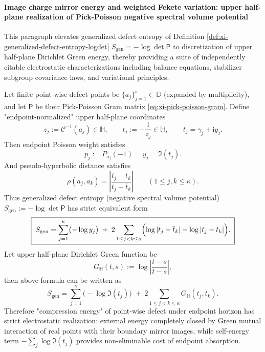 \paragraph{Image charge mirror energy and weighted Fekete variation: upper half-plane realization of Pick-Poisson negative spectral volume potential}
This paragraph elevates generalized defect entropy of Definition \ref{def:xi-generalized-defect-entropy-logdet}
\(
S_{\mathrm{gen}}=-\log\det\mathsf P
\)
to discretization of upper half-plane Dirichlet Green energy, thereby providing a suite of independently citable electrostatic characterizations including balance equations, stabilizer subgroup covariance laws, and variational principles.

\begin{proposition}\label{prop:xi-pick-poisson-image-charge-green-energy}
Let finite point-wise defect points be \(\{a_j\}_{j=1}^{\kappa}\subset\mathbb{D}\) (expanded by multiplicity), and let \(\mathsf P\) be their Pick-Poisson Gram matrix \eqref{eq:xi-pick-poisson-gram}.
Define "endpoint-normalized" upper half-plane coordinates
\[
z_j:=\mathcal{C}^{-1}(a_j)\in\mathbb{H},
\qquad
t_j:=-\frac{1}{z_j}\in\mathbb{H},
\qquad
t_j=\gamma_j+\mathrm{i}y_j.
\]
Then endpoint Poisson weight satisfies
\[
\boxed{\;p_j:=P_{a_j}(-1)=y_j=\Im(t_j).\;}
\]
And pseudo-hyperbolic distance satisfies
\[
\boxed{\;
\rho(a_j,a_k)=\left|\frac{t_j-t_k}{t_j-\overline t_k}\right|\qquad(1\le j,k\le\kappa).\;}
\]
Thus generalized defect entropy (negative spectral volume potential)
\(
S_{\mathrm{gen}}:=-\log\det\mathsf P
\)
has strict equivalent form
\[
\boxed{\;
S_{\mathrm{gen}}
=\sum_{j=1}^{\kappa}\bigl(-\log y_j\bigr)
\;+\;
2\sum_{1\le j<k\le\kappa}\Bigl(\log|t_j-\overline t_k|-\log|t_j-t_k|\Bigr).\;}
\]
Let upper half-plane Dirichlet Green function be
\[
G_{\mathbb{H}}(t,s):=\log\left|\frac{t-\overline s}{t-s}\right|,
\]
then above formula can be written as
\[
S_{\mathrm{gen}}
=\sum_{j=1}^{\kappa}\bigl(-\log\Im(t_j)\bigr)
\;+\;
2\sum_{1\le j<k\le\kappa}G_{\mathbb{H}}(t_j,t_k).
\]
Therefore "compression energy" of point-wise defect under endpoint horizon has strict electrostatic realization: external energy completely closed by Green mutual interaction of real points with their boundary mirror images, while self-energy term \(-\sum_j\log\Im(t_j)\) provides non-eliminable cost of endpoint absorption.
\end{proposition}
